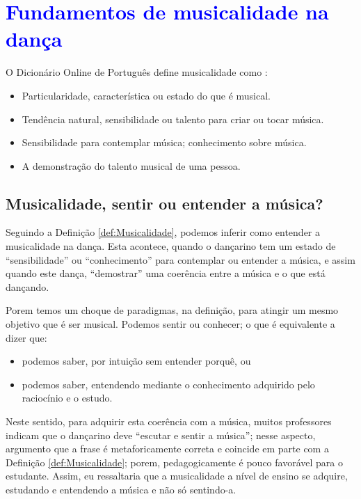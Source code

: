 
\chapter{\textcolor{blue}{Fundamentos de musicalidade na dança}}

\begin{definition}[Musicalidade:] 
\label{def:Musicalidade}
O Dicionário Online de Português define musicalidade como \cite{diciomusicalidade}:
\begin{itemize}
\item Particularidade, característica ou estado do que é musical.
\item Tendência natural, sensibilidade ou talento para criar ou tocar música.
\item Sensibilidade para contemplar música; conhecimento sobre música.
\item A demonstração do talento musical de uma pessoa.
\end{itemize}
\end{definition}

\section{Musicalidade, sentir ou entender a música?}
Seguindo a Definição \ref{def:Musicalidade}, podemos inferir como entender a musicalidade na dança.
Esta acontece, quando o dançarino tem um estado de ``sensibilidade'' ou ``conhecimento'' para contemplar ou entender a música,
e assim quando este dança, ``demostrar'' uma coerência entre a música e o que está dançando.

Porem temos um choque de paradigmas, na definição, para atingir um mesmo objetivo que é ser musical.
Podemos sentir ou conhecer; o que é equivalente a dizer que:
\begin{itemize} 
\item podemos saber, por intuição sem entender porquê, ou
\item podemos saber, entendendo mediante o conhecimento adquirido pelo raciocínio e o estudo.\\
\end{itemize}



Neste sentido, para adquirir esta coerência com a música, 
muitos professores indicam que o dançarino deve ``escutar e sentir a música'';
nesse aspecto, argumento que a frase é metaforicamente correta e coincide em parte com a Definição \ref{def:Musicalidade};
porem, pedagogicamente  é pouco favorável para o estudante.
Assim, eu ressaltaria que a musicalidade a nível de ensino se adquire,
estudando e entendendo a música e não só sentindo-a.
 
